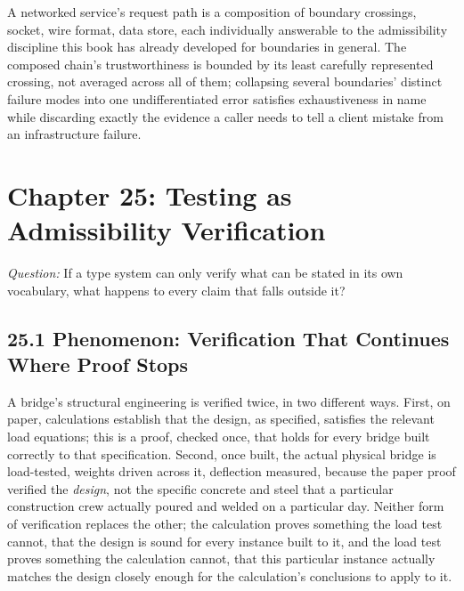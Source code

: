 \documentclass[11pt]{book}
\begin{document}
\begin{invariantbox}
A networked service's request path is a composition of boundary crossings, socket, wire format, data store, each individually answerable to the admissibility discipline this book has already developed for boundaries in general. The composed chain's trustworthiness is bounded by its least carefully represented crossing, not averaged across all of them; collapsing several boundaries' distinct failure modes into one undifferentiated error satisfies exhaustiveness in name while discarding exactly the evidence a caller needs to tell a client mistake from an infrastructure failure.
\end{invariantbox}

\clearpage

\chapter*{Chapter 25: Testing as Admissibility Verification}

\begin{firstprinciples}
\textit{Question:} If a type system can only verify what can be stated in its own vocabulary, what happens to every claim that falls outside it?
\end{firstprinciples}

\section*{25.1 Phenomenon: Verification That Continues Where Proof Stops}

A bridge's structural engineering is verified twice, in two different ways. First, on paper, calculations establish that the design, as specified, satisfies the relevant load equations; this is a proof, checked once, that holds for every bridge built correctly to that specification. Second, once built, the actual physical bridge is load-tested, weights driven across it, deflection measured, because the paper proof verified the \emph{design}, not the specific concrete and steel that a particular construction crew actually poured and welded on a particular day. Neither form of verification replaces the other; the calculation proves something the load test cannot, that the design is sound for every instance built to it, and the load test proves something the calculation cannot, that this particular instance actually matches the design closely enough for the calculation's conclusions to apply to it.
\end{document}
